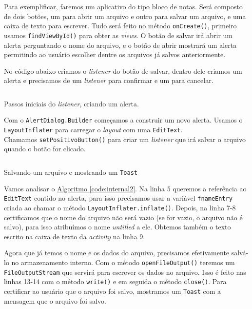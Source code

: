 \documentclass[a4paper,12pt,brazil,oneside]{book}
\begin{document}
\begin{singlespace}
		Para exemplificar, faremos um aplicativo do tipo bloco de notas. Será composto de dois botões, um para abrir um arquivo e outro para salvar um arquivo, e uma caixa de texto para escrever. Tudo será feito no método \texttt{onCreate()}, primeiro  usamos \texttt{findViewById()} para obter as \emph{views}. O botão de salvar irá abrir um alerta perguntando o nome do arquivo, e o botão de abrir mostrará um alerta permitindo ao usuário escolher dentre os arquivos já salvos anteriormente.

		No código abaixo criamos o \emph{listener} do botão de salvar, dentro dele criamos um alerta e precisamos de um \emph{listener} para confirmar e um para cancelar.

		\begin{listing}[H]
		\inputminted[linenos=true,fontsize=\small,frame=lines, framesep=2mm, tabsize=2,numbersep=5pt]{java}{src/api/storage/internal1.java}
		\caption{Passos iniciais do \emph{listener}, criando um alerta.}
		\label{code:internal1}
		\end{listing} 	
		\newpage
		Com o \texttt{AlertDialog.Builder} começamos a construir um novo alerta. Usamos o \texttt{LayoutInflater} para carregar o \emph{layout} com uma \texttt{EditText}.
		\\ Chamamos \texttt{setPositivoButton()} para criar um \emph{listener} que irá salvar o arquivo quando o botão for clicado.

		\begin{listing}[H]
		\inputminted[linenos=true,fontsize=\small,frame=lines, framesep=2mm, tabsize=2,numbersep=5pt]{java}{src/api/storage/internal2.java}
		\caption{Salvando um arquivo e mostrando um \texttt{Toast}}
		\label{code:internal2}
		\end{listing} 	

		Vamos analisar o \hyperref[code:internal2]{Algoritmo \ref*{code:internal2}}. Na linha 5 queremos a referência ao \texttt{EditText} contido no alerta, para isso precisamos usar a variável \texttt{fnameEntry} criada ao chamar o método \texttt{LayoutInflater.inflate()}. Depois, na linha 7-8 certificamos que o nome do arquivo não será vazio (se for vazio, o arquivo não é salvo), para isso atribuímos o nome \emph{untitled} a ele. Obtemos também o texto escrito na caixa de texto da \emph{activity} na linha 9.

		Agora que já temos o nome e os dados do arquivo, precisamos efetivamente salvá-lo no armazenamento interno. Com o método \texttt{openFileOutput()} teremos um \texttt{FileOutputStream} que servirá para escrever os dados no arquivo. Isso é feito nas linhas 13-14 com o método \texttt{write()} e em seguida o método \texttt{close()}.
		Para certificar ao usuário que o arquivo foi salvo, mostramos um \texttt{Toast} com a mensagem que o arquivo foi salvo.


\end{singlespace}
\end{document}
